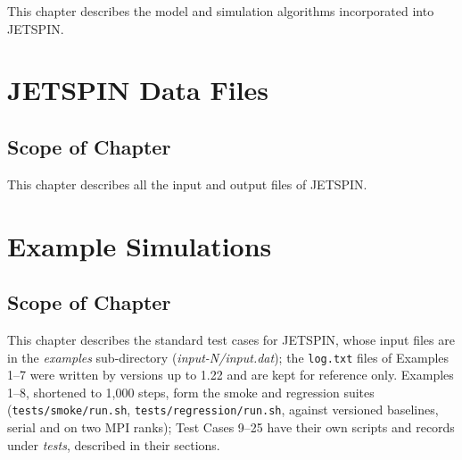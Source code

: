 \documentclass[oneside,english]{book}
\begin{document}
This chapter describes the model and simulation algorithms incorporated
into JETSPIN.





















\newpage{}

\chapter{JETSPIN Data Files\label{chap:JETSPIN-Data-Files}}

\section*{Scope of Chapter}

This chapter describes all the input and output files of JETSPIN.





\newpage{}

\chapter{Example Simulations}

\section*{Scope of Chapter}

This chapter describes the standard test cases for JETSPIN, whose input
files are in the \textit{examples} sub-directory (\textit{input-N/input.dat});
the \texttt{log.txt} files of Examples 1--7 were written by versions up to
1.22 and are kept for reference only. Examples 1--8, shortened to 1,000
steps, form the smoke and regression suites (\texttt{tests/smoke/run.sh},
\texttt{tests/regression/run.sh}, against versioned baselines, serial and
on two MPI ranks); Test Cases 9--25 have their own scripts and records under
\textit{tests}, described in their sections.
\end{document}
